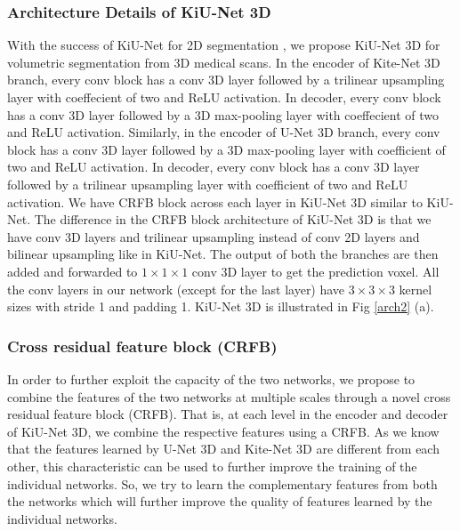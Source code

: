 \documentclass[journal,twoside,web]{ieeecolor}
\begin{document}
\subsubsection{Architecture Details of KiU-Net 3D}





With the success of KiU-Net for 2D segmentation \cite{valanarasu2020kiu}, we propose KiU-Net 3D for  volumetric segmentation from 3D medical scans. In the encoder of Kite-Net 3D branch, every conv block has a conv 3D layer followed by a trilinear upsampling layer with coeffecient of two and ReLU activation. In decoder, every conv block has a conv 3D layer followed by a 3D max-pooling layer with coeffecient of two and ReLU activation. Similarly, in  the encoder of U-Net 3D branch, every conv block has a conv 3D layer followed by a 3D max-pooling layer with coefficient of two and ReLU activation. In decoder, every conv block has a conv 3D layer followed by a trilinear upsampling layer with coefficient of two and ReLU activation. We have CRFB block across each layer in KiU-Net 3D similar to KiU-Net. The difference in the CRFB block architecture of KiU-Net 3D is that we have conv 3D layers and trilinear upsampling instead of conv 2D layers and bilinear upsampling like in KiU-Net. The output of both the branches are then added and forwarded to $1 \times 1 \times 1$ conv 3D layer to get the prediction voxel. All the conv layers in our network (except for the last layer) have $3 \times 3 \times 3$ kernel sizes with stride 1 and padding 1. KiU-Net 3D is illustrated in Fig \ref{arch2} (a).   



\subsubsection{Cross residual feature block (CRFB)}

In order to further exploit the capacity of the two networks, we propose to combine the features of the two networks at multiple scales through a novel cross residual feature block (CRFB). That is, at each level in the encoder and decoder of KiU-Net 3D, we combine the respective features using a CRFB.  As we know that the features learned by U-Net 3D and Kite-Net 3D are different from each other, this characteristic can be used to further improve the training of the individual networks. So, we try to learn the complementary features from both the networks which will further improve the quality of features learned by the individual networks.
\end{document}
